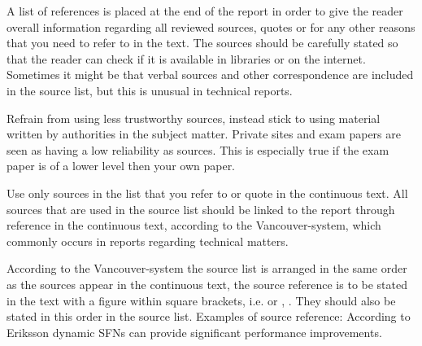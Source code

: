 A list of references is placed at the end of the report in order to give the reader overall information regarding all reviewed sources, quotes or for any other reasons that you need to refer to in the text. The sources should be carefully stated so that the reader can check if it is available in libraries or on the internet. Sometimes it might be that verbal sources and other correspondence are included in the source list, but this is unusual in technical reports.

Refrain from using less trustworthy sources, instead stick to using material written by authorities in the subject matter. Private sites and exam papers are seen as having a low reliability as sources. This is especially true if the exam paper is of a lower level then your own paper.

Use only sources in the list that you refer to or quote in the continuous text. All sources that are used in the source list should be linked to the report through reference in the continuous text, according to the Vancouver-system, which commonly occurs in reports regarding technical matters.

According to the Vancouver-system the source list is arranged in the same order as the sources appear in the continuous text, the source reference is to be stated in the text with a figure within square brackets, i.e. \cite{dataterm-kth} or \cite{eriksson-2001}, \cite{stomquist}. They should also be stated in this order in the source list. Examples of source reference: According to Eriksson \cite{eriksson-2001}  dynamic SFNs can provide significant performance improvements.
\fi
